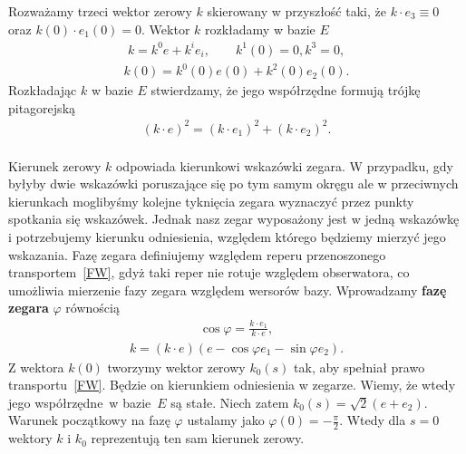Rozważamy trzeci wektor zerowy $k$ skierowany w przyszłość taki, 
że $k\cdot e_3 \equiv 0$ oraz $k(0)\cdot e_1(0) =0$.  
Wektor $k$ rozkładamy w bazie $E$
\begin{align*}
k = k^0 e +  k^i e_i, \qquad k^1(0)=0, k^3 = 0,
\end{align*}
\begin{align*}
k(0) = k^0(0) e(0) + k^2(0) e_2(0) .
\end{align*}
Rozkładając $k$ w bazie $E$ stwierdzamy, że jego współrzędne 
formują trójkę pitagorejską 
\begin{align}
(k \cdot e)^2 = (k \cdot e_1)^2 +  (k \cdot e_2)^2 .
\end{align}
\\
Kierunek zerowy $k$ odpowiada kierunkowi wskazówki zegara. 
 W przypadku, gdy byłyby 
dwie wskazówki poruszające się po tym samym okręgu ale w 
przeciwnych kierunkach moglibyśmy kolejne tyknięcia zegara
wyznaczyć przez punkty spotkania się wskazówek. 
Jednak nasz zegar wyposażony jest w jedną wskazówkę i 
potrzebujemy kierunku odniesienia, względem którego będziemy 
mierzyć jego wskazania. Fazę zegara definiujemy względem reperu
przenoszonego transportem~\eqref{FW}, gdyż taki reper nie 
rotuje względem obserwatora, co umożliwia mierzenie  
fazy zegara względem wersorów bazy. 
Wprowadzamy \textbf{fazę zegara} $\varphi$ 
równością
\begin{align}\label{phi_definition}
\cos\varphi = \frac{k\cdot e_1}{k\cdot e} ,
\end{align}
\begin{align*}
k = (k\cdot e) (e -\cos\varphi e_1 - \sin\varphi e_2 ).
\end{align*}
Z wektora $k(0)$ tworzymy wektor zerowy $k_0(s)$ tak, aby spełniał 
prawo transportu~\eqref{FW}. Będzie on kierunkiem odniesienia 
w zegarze. Wiemy, że wtedy jego współrzędne~w 
bazie~$E$ są stałe. Niech zatem
$k_0(s) =  \sqrt{2} (e + e_2)$.
Warunek początkowy na fazę $\varphi$ ustalamy jako
$\varphi(0)=-\frac{\pi}{2}$. Wtedy dla $s=0$ wektory
$k$ i $k_0$ reprezentują ten sam kierunek zerowy. 
